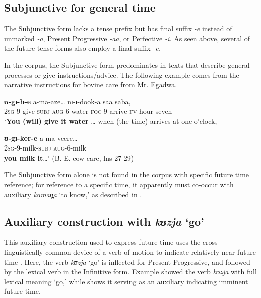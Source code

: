 \documentclass[output=paper]{langsci/langscibook}
\begin{document}
\subsection{Subjunctive for general time} \label{sec:sarvasy:7.1}

The Subjunctive form lacks a tense prefix but has final suffix \textit{-e} instead of unmarked \textit{-a}, Present Progressive \textit{-aa}, or Perfective \textit{-i.} As seen above, several of the future tense forms also employ a final suffix \textit{-e.} 

In the corpus, the Subjunctive form predominates in texts that describe general processes or give instructions/advice. The following example comes from the narrative instructions for bovine care from Mr. Egadwa. 

\ea\label{ex:sarvasy:18}
\gll \textbf{ʊ-gɪ-h-e}     a-ma-aze…   nɪ-ɪ-dook-a   saa   saba, \\  
\textsc{\textup{2sg}}\textsc{-}9-give-\textsc{subj}  \textsc{aug}-6-water  \textsc{foc}-9-arrive-\textsc{fv}  hour  seven \\
\glt ‘\textbf{You (will) give it water} … when (the time) arrives at one o’clock,

\gll \textbf{ʊ-gɪ-ker-e}   a-ma-veere\ldots \\
\textsc{2sg}-9-milk-\textsc{subj}  \textsc{aug}-6-milk \\
\glt \textbf{you milk it}…’ (B. E. cow care, lns 27-29)
\z

The Subjunctive form alone is not found in the corpus with specific future time reference; for reference to a specific time, it apparently must co-occur with auxiliary \textit{kʊman̪a} ‘to know,’ as described in . 

\subsection{Auxiliary construction with \textit{kʊzja} ‘go’} \label{sec:sarvasy:7.2}

This auxiliary construction used to express future time uses the cross-linguistically-common device of a verb of motion to indicate relatively-near future time \citep[161-163]{HeineKuteva2004}. Here, the verb \textit{kʊzja} ‘go’ is inflected for Present Progressive, and followed by the lexical verb in the Infinitive form. Example  showed the verb \textit{kʊzja} with full lexical meaning ‘go,’ while  shows it serving as an auxiliary indicating imminent future time. 
\end{document}

